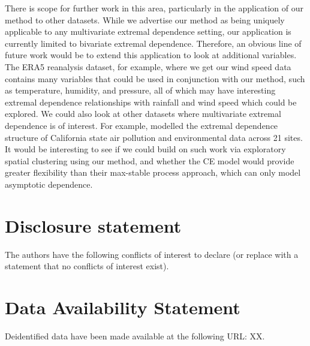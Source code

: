 \documentclass[
  12pt]{article}
\begin{document}
There is scope for further work in this area, particularly in the application of our method to other datasets.
While we advertise our method as being uniquely applicable to any multivariate extremal dependence setting, our application is currently limited to bivariate extremal dependence.
Therefore, an obvious line of future work would be to extend this application to look at additional variables. 
The ERA5 reanalysis dataset, for example, where we get our wind speed data contains many variables that could be used in conjunction with our method, such as temperature, humidity, and pressure, all of which may have interesting extremal dependence relationships with rainfall and wind speed which could be explored.
We could also look at other datasets where multivariate extremal dependence is of interest. 
For example, \citet{Vettori2020} modelled the extremal dependence structure of California state air pollution and environmental data across 21 sites. 
It would be interesting to see if we could build on such work via exploratory spatial clustering using our method, and whether the CE model would provide greater flexibility than their max-stable process approach, which can only model asymptotic dependence. 

\section{Disclosure statement}\label{disclosure-statement}

The authors have the following conflicts of interest to declare (or
replace with a statement that no conflicts of interest exist).

\section{Data Availability Statement}\label{data-availability-statement}

Deidentified data have been made available at the following URL: XX.
\end{document}
